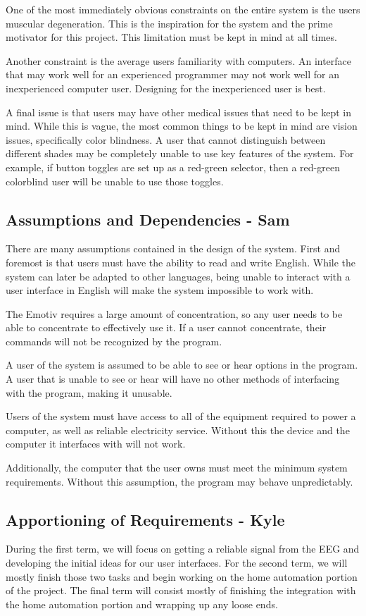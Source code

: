 \documentclass{article}
\begin{document}
One of the most immediately obvious constraints on the entire system is the
users muscular degeneration. This is the inspiration for the system and the
prime motivator for this project. This limitation must be kept in mind at
all times.

Another constraint is the average users familiarity with computers. An
interface that may work well for an experienced programmer may not work well
for an inexperienced computer user. Designing for the inexperienced user is
best.

A final issue is that users may have other medical issues that need to be
kept in mind. While this is vague, the most common things to be kept in mind
are vision issues, specifically color blindness. A user that cannot
distinguish between different shades may be completely unable to use key
features of the system. For example, if button toggles are set up as a
red-green selector, then a red-green colorblind user will be unable to use
those toggles.

\subsection{Assumptions and Dependencies - Sam}

There are many assumptions contained in the design of the system. First and
foremost is that users must have the ability to read and write English.
While the system can later be adapted to other languages, being unable to
interact with a user interface in English will make the system impossible to
work with.

The Emotiv requires a large amount of concentration, so any user needs to be
able to concentrate to effectively use it. If a user cannot concentrate,
their commands will not be recognized by the program.

A user of the system is assumed to be able to see or hear options in the
program. A user that is unable to see or hear will have no other methods of
interfacing with the program, making it unusable.

Users of the system must have access to all of the equipment required to
power a computer, as well as reliable electricity service. Without this the
device and the computer it interfaces with will not work.

Additionally, the computer that the user owns must meet the minimum system
requirements. Without this assumption, the program may behave unpredictably.

\subsection{Apportioning of Requirements - Kyle}
During the first term, we will focus on getting a reliable signal from the EEG and developing the initial ideas for our user interfaces. For the second term, we will mostly finish those two tasks and begin working on the home automation portion of the project. The final term will consist mostly of finishing the integration with the home automation portion and wrapping up any loose ends.
\newpage
\end{document}
